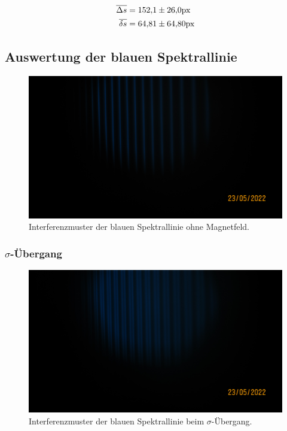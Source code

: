 \begin{align*}
    \overline{\Delta s}&=\num{152.1\pm 26.0}\text{px}\\
    \overline{\delta s}&=\num{64.81\pm 64.8}\text{px}
\end{align*}

\subsection{Auswertung der blauen Spektrallinie}
\label{sec:blau}
\begin{figure}[H]
    \centering
    \includegraphics[scale= 0.2]{Messung/Blau[3].JPG}
    \caption{Interferenzmuster der blauen Spektrallinie ohne Magnetfeld.}
    \label{fig:blau}
\end{figure}
\noindent


\subsubsection[]{$\sigma$-Übergang}
\label{sec:sigma}

\begin{figure}[H]
    \centering
    \includegraphics[scale= 0.2]{Messung/Blau_Sigma[4].JPG}
    \caption{Interferenzmuster der blauen Spektrallinie beim $\sigma$-Übergang.}
    \label{fig:blau_sigma}
\end{figure}
\noindent

